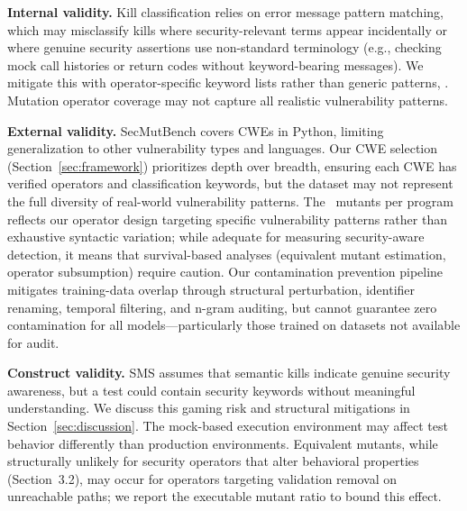 \documentclass[sigconf,anonymous,review]{acmart}
\begin{document}
\textbf{Internal validity.} Kill classification relies on error message pattern matching, which may misclassify kills where security-relevant terms appear incidentally or where genuine security assertions use non-standard terminology (e.g., checking mock call histories or return codes without keyword-bearing messages). We mitigate this with operator-specific keyword lists rather than generic patterns, .  Mutation operator coverage may not capture all realistic vulnerability patterns.

\textbf{External validity.} SecMutBench covers  CWEs in Python, limiting generalization to other vulnerability types and languages. Our CWE selection (Section~\ref{sec:framework}) prioritizes depth over breadth, ensuring each CWE has verified operators and classification keywords, but the dataset may not represent the full diversity of real-world vulnerability patterns. The ~mutants per program reflects our operator design targeting specific vulnerability patterns rather than exhaustive syntactic variation; while adequate for measuring security-aware detection, it means that survival-based analyses (equivalent mutant estimation, operator subsumption) require caution. Our contamination prevention pipeline mitigates training-data overlap through structural perturbation, identifier renaming, temporal filtering, and n-gram auditing, but cannot guarantee zero contamination for all models---particularly those trained on datasets not available for audit.

\textbf{Construct validity.} SMS assumes that semantic kills indicate genuine security awareness, but a test could contain security keywords without meaningful understanding. We discuss this gaming risk and structural mitigations in Section~\ref{sec:discussion}. The mock-based execution environment may affect test behavior differently than production environments. Equivalent mutants, while structurally unlikely for security operators that alter behavioral properties (Section~3.2), may occur for operators targeting validation removal on unreachable paths; we report the executable mutant ratio to bound this effect.
\end{document}
